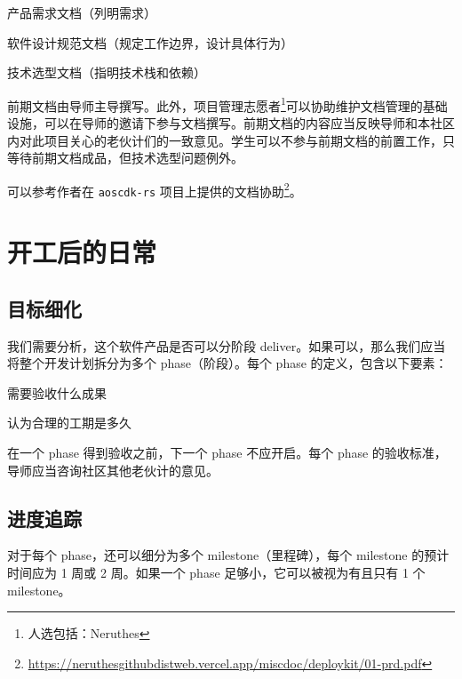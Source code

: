 \documentclass[a4paper,11pt]{article}
\newcommand{\smallnote}[1]{{\sffamily\footnotesize#1}}
\begin{document}
\begin{compactitem}
	\item 产品需求文档\smallnote{（列明需求）}
	\item 软件设计规范文档\smallnote{（规定工作边界，设计具体行为）}
	\item 技术选型文档\smallnote{（指明技术栈和依赖）}
\end{compactitem}

前期文档由导师主导撰写。此外，项目管理志愿者\footnote{人选包括：Neruthes}可以协助维护文档管理的基础设施，可以在导师的邀请下参与文档撰写。前期文档的内容应当反映导师和本社区内对此项目关心的老伙计们的一致意见。学生可以不参与前期文档的前置工作，只等待前期文档成品，但技术选型问题例外。

可以参考作者在 \texttt{aoscdk-rs} 项目上提供的文档协助\footnote{\href{https://neruthesgithubdistweb.vercel.app/miscdoc/deploykit/01-prd.pdf}{https://neruthesgithubdistweb.vercel.app/miscdoc/deploykit/01-prd.pdf}}。









\section{开工后的日常}

\subsection{目标细化}

我们需要分析，这个软件产品是否可以分阶段 deliver。如果可以，那么我们应当将整个开发计划拆分为多个 phase（阶段）。每个 phase 的定义，包含以下要素：

\begin{compactitem}
    \item 需要验收什么成果
    \item 认为合理的工期是多久
\end{compactitem}

在一个 phase 得到验收之前，下一个 phase 不应开启。每个 phase 的验收标准，导师应当咨询社区其他老伙计的意见。

\subsection{进度追踪}

对于每个 phase，还可以细分为多个 milestone（里程碑），每个 milestone 的预计时间应为 1 周或 2 周。如果一个 phase 足够小，它可以被视为有且只有 1 个 milestone。
\end{document}
